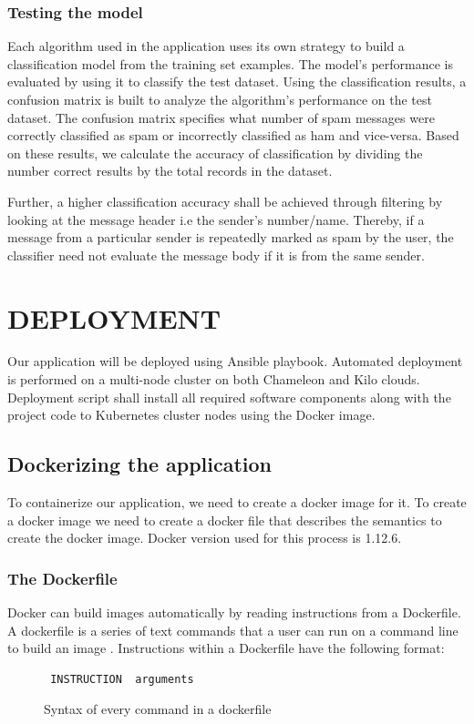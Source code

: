 \documentclass[9pt,twocolumn,twoside]{../../styles/osajnl}
\begin{document}
\subsubsection{Testing the model}

Each algorithm used in the application uses its own strategy to build
a classification model from the training set examples. The model's
performance is evaluated by using it to classify the test
dataset. Using the classification results, a confusion
matrix is built to analyze the algorithm's performance on the test dataset.
The confusion matrix specifies what number of spam messages were
correctly classified as spam or incorrectly classified as ham and
vice-versa. Based on these results, we calculate the accuracy of
classification by dividing the number correct results by the total
records in the dataset.

\noindent
Further, a higher classification accuracy shall be achieved through
filtering by looking at the message header i.e the sender's
number/name. Thereby, if a message from a particular sender is
repeatedly marked as spam by the user, the classifier need not
evaluate the message body if it is from the same sender.

\section{DEPLOYMENT}
Our application will be deployed using Ansible playbook. Automated
deployment is performed on a multi-node cluster on both Chameleon and
Kilo clouds. Deployment script shall install all required software
components along with the project code to Kubernetes cluster nodes using the
Docker image.

\subsection{Dockerizing the application}
To containerize our application, we need to create a docker image for
it. To create a docker image we need to create a docker file that
describes the semantics to create the docker image. Docker version
used for this process is 1.12.6.

\subsubsection{The Dockerfile}
Docker can build images automatically by reading instructions from a
Dockerfile. A dockerfile is a series of text commands that a user can
run on a command line to build an image \cite{www-dockerfile-documentation}.
\newline
Instructions within a Dockerfile have the following format:
\begin{figure}[h]
\begin{verbatim}
 INSTRUCTION  arguments
\end{verbatim}
\caption{Syntax of every command in a dockerfile}
\label{Syntax of every command in a dockerfile}
\end{figure}
\end{document}
